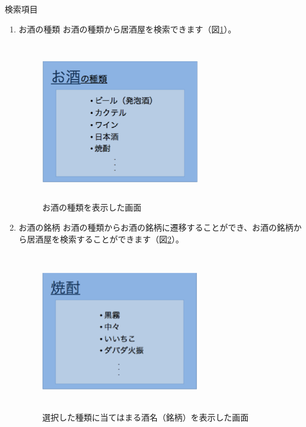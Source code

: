 \documentclass[a4j,titlepage]{jarticle}
\begin{document}
検索項目
\begin{enumerate}
\item お酒の種類
お酒の種類から居酒屋を検索できます（図\ref{fig:2}）。

\begin {figure}[htbp]
    \begin{center}
    \includegraphics [height=7cm, width=7cm]{extrnal_design_document_image/2.eps}
    \caption {お酒の種類を表示した画面}
    \label {fig:2}
    \end{center}
\end {figure}

\item お酒の銘柄
お酒の種類からお酒の銘柄に遷移することができ、お酒の銘柄から居酒屋を検索することができます（図\ref{fig:3}）。

\begin {figure}[htbp]
    \begin{center}
    \includegraphics [height=7cm, width=7cm]{extrnal_design_document_image/3.eps}
    \caption {選択した種類に当てはまる酒名（銘柄）を表示した画面}
    \label {fig:3}
    \end{center}
\end {figure}



\end{enumerate}
\end{document}
